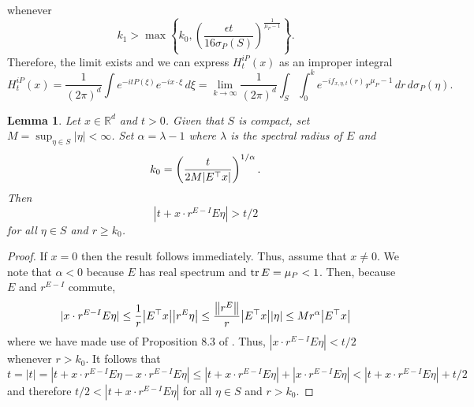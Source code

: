 \documentclass[11pt]{article}
\newtheorem{lemma}[theorem]{Lemma}
\newcommand{\lp}{\left(}
\newcommand{\rp}{\right)}
\newcommand{\lc}{\left\{}
\newcommand{\rc}{\right\}}
\newcommand{\f}[2]{\frac{#1}{#2}}
\begin{document}
whenever 
\begin{equation*}
    k_1 > \max \lc k_0 , \lp \f{\epsilon t}{16\sigma_P(S)} \rp^{\f{1}{\mu_P - 1}} \rc.
\end{equation*}
Therefore, the limit exists and we can express $H^{iP}_t(x)$ as an improper integral
\begin{equation*}
    H^{iP}_{t}(x) = \f{1}{(2\pi)^{d}}\int e^{-it P(\xi)} e^{-i x\cdot \xi}\,d\xi = \lim_{k\to \infty}\f{1}{(2\pi)^{d}}\int_S  \int_0^k e^{-if_{x,\eta,t}(r)} r^{\mu_P - 1}\,dr\,d\sigma_P(\eta).
\end{equation*}



\begin{lemma}\label{lem:k_0}
Let $x\in\mathbb{R}^d$ and $t>0$. Given that $S$ is compact, set $M=\sup_{\eta\in S}|\eta|<\infty$. Set $\alpha=\lambda-1$ where $\lambda$ is the spectral radius of $E$ and
\begin{equation*}
    k_0 = \lp \f{t}{2M \abs{E^\top x}} \rp^{1/\alpha}.
\end{equation*}
Then
\begin{equation*}
    \left|t+x\cdot r^{E-I}E\eta\right|>t/2  
\end{equation*}
for all $\eta \in S$ and  $r\geq k_0$.
\end{lemma}

\begin{proof}
If $x=0$ then the result follows immediately. Thus, assume that $x\neq 0$. We note that $\alpha<0$ because $E$ has real spectrum and $\tr E=\mu_P<1$. Then, because $E$ and $r^{E-I}$ commute,
\begin{equation*}
    |x\cdot r^{E-I} E\eta| \leq \frac{1}{r}\abs{E^\top x} \abs{r^E\eta} \leq \frac{\norm{ r^{E}}}{r} \abs{E^{\top}x}\abs{\eta} \leq Mr^{\alpha} \abs{E^\top x}
\end{equation*}
where we have made use of Proposition 8.3 of \cite{Randles2017}. Thus, $|x\cdot r^{E-I}E\eta|<t/2$ whenever  $r > k_0$. It follows that
\begin{equation*}
    t=|t|=|t+x\cdot r^{E-I}E\eta-x\cdot r^{E-I}E\eta|\leq |t+x\cdot r^{E-I}E\eta|+|x\cdot r^{E-I}E\eta|<|t+x\cdot r^{E-I}E\eta|+t/2
\end{equation*}
and therefore $t/2<|t+x\cdot r^{E-I}E\eta|$ for all $\eta\in S$ and $r> k_0$.
\end{proof}
\end{document}
